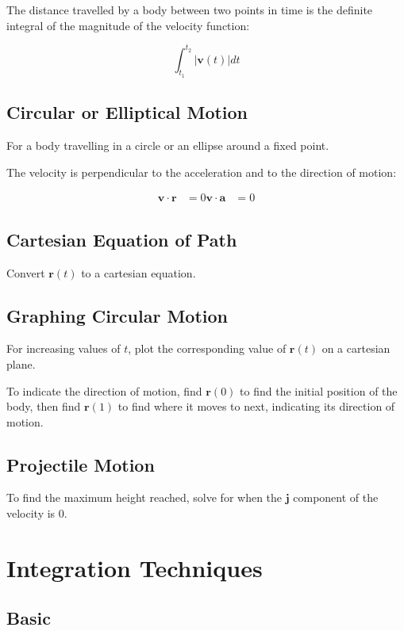 \documentclass[a4paper,11pt]{article}
\newcommand{\bb}{\boldsymbol}
\begin{document}
The distance travelled by a body between two points in time is the definite
integral of the magnitude of the velocity function:

$$
\int_{t_1}^{t_2} \lvert \bb{v}(t) \rvert dt
$$


\subsection{Circular or Elliptical Motion}

For a body travelling in a circle or an ellipse around a fixed point.

The velocity is perpendicular to the acceleration and to the direction of
motion:

$$
\begin{aligned}
\bb{v} \cdot \bb{r} & = 0
\bb{v} \cdot \bb{a} & = 0
\end{aligned}
$$


\subsection{Cartesian Equation of Path}

Convert $\bb{r}(t)$ to a cartesian equation.


\subsection{Graphing Circular Motion}

For increasing values of $t$, plot the corresponding value of $\bb{r}(t)$ on a
cartesian plane.


To indicate the direction of motion, find $\bb{r}(0)$ to find the initial
position of the body, then find $\bb{r}(1)$ to find where it moves to next,
indicating its direction of motion.


\subsection{Projectile Motion}

To find the maximum height reached, solve for when the $\bb{j}$ component of
the velocity is 0.




\section{Integration Techniques}

\subsection{Basic}
\end{document}
